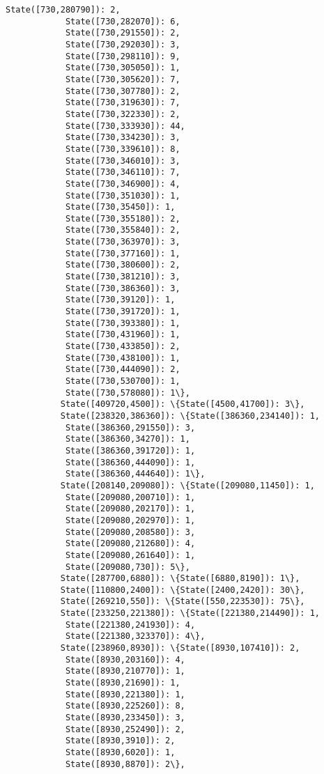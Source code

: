\documentclass[11pt]{article}
\begin{document}
\begin{Verbatim}[commandchars=\\\{\}]
            State([730,280790]): 2,
            State([730,282070]): 6,
            State([730,291550]): 2,
            State([730,292030]): 3,
            State([730,298110]): 9,
            State([730,305050]): 1,
            State([730,305620]): 7,
            State([730,307780]): 2,
            State([730,319630]): 7,
            State([730,322330]): 2,
            State([730,333930]): 44,
            State([730,334230]): 3,
            State([730,339610]): 8,
            State([730,346010]): 3,
            State([730,346110]): 7,
            State([730,346900]): 4,
            State([730,351030]): 1,
            State([730,35450]): 1,
            State([730,355180]): 2,
            State([730,355840]): 2,
            State([730,363970]): 3,
            State([730,377160]): 1,
            State([730,380600]): 2,
            State([730,381210]): 3,
            State([730,386360]): 3,
            State([730,39120]): 1,
            State([730,391720]): 1,
            State([730,393380]): 1,
            State([730,431960]): 1,
            State([730,433850]): 2,
            State([730,438100]): 1,
            State([730,444090]): 2,
            State([730,530700]): 1,
            State([730,578080]): 1\},
           State([409720,4500]): \{State([4500,41700]): 3\},
           State([238320,386360]): \{State([386360,234140]): 1,
            State([386360,291550]): 3,
            State([386360,34270]): 1,
            State([386360,391720]): 1,
            State([386360,444090]): 1,
            State([386360,444640]): 1\},
           State([208140,209080]): \{State([209080,11450]): 1,
            State([209080,200710]): 1,
            State([209080,202170]): 1,
            State([209080,202970]): 1,
            State([209080,208580]): 3,
            State([209080,212680]): 4,
            State([209080,261640]): 1,
            State([209080,730]): 5\},
           State([287700,6880]): \{State([6880,8190]): 1\},
           State([110800,2400]): \{State([2400,2420]): 30\},
           State([269210,550]): \{State([550,223530]): 75\},
           State([233250,221380]): \{State([221380,214490]): 1,
            State([221380,241930]): 4,
            State([221380,323370]): 4\},
           State([238960,8930]): \{State([8930,107410]): 2,
            State([8930,203160]): 4,
            State([8930,210770]): 1,
            State([8930,21690]): 1,
            State([8930,221380]): 1,
            State([8930,225260]): 8,
            State([8930,233450]): 3,
            State([8930,252490]): 2,
            State([8930,3910]): 2,
            State([8930,6020]): 1,
            State([8930,8870]): 2\},

\end{Verbatim}
\end{document}
